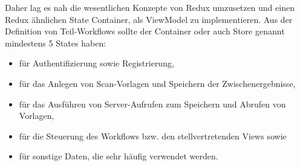 \documentclass[notables, nomenclature, oneside, 150]{HSMW-Thesis}
\begin{document}
		Daher lag es nah die wesentlichen Konzepte von Redux umzusetzen und einen Redux ähnlichen State Container, als ViewModel zu implementieren. Aus der Definition von Teil-Workflows sollte der Container oder auch Store genannt mindestens 5 States haben: 
		\vspace{-5mm}
		\begin{itemize}
			\item für Authentifizierung sowie Registrierung,
			\item für das Anlegen von Scan-Vorlagen und Speichern der Zwischenergebnisse,
			\item für das Ausführen von Server-Aufrufen zum Speichern und Abrufen von Vorlagen, 
			\item für die Steuerung des Workflows bzw. den stellvertretenden Views sowie
			\item für sonstige Daten, die sehr häufig verwendet werden.
		\end{itemize}
		
\end{document}
